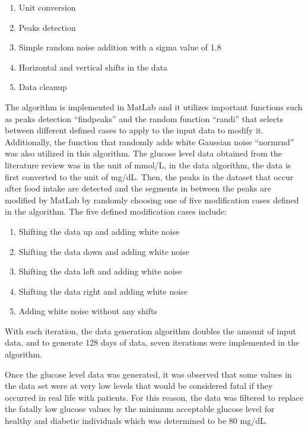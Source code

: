 \begin{enumerate}
    \item Unit conversion
    \item Peaks detection
    \item Simple random noise addition with a sigma value of 1.8
    \item Horizontal and vertical shifts in the data
    \item Data cleanup 
\end{enumerate}


The algorithm is implemented in MatLab and it utilizes important functions such as peaks detection “findpeaks” and the random function “randi” that selects between different defined cases to apply to the input data to modify it. Additionally, the function that randomly adds white Gaussian noise “normrnd” was also utilized in this algorithm.  
The glucose level data obtained from the literature review was in the unit of mmol/L, in the data algorithm, the data is first converted to the unit of mg/dL.
Then, the peaks in the dataset that occur after food intake are detected and the segments in between the peaks are modified by MatLab by randomly choosing one of five modification cases defined in the algorithm. 
The five defined modification cases include: 

\begin{enumerate}
    \item Shifting the data up and adding white noise 
    \item Shifting the data down and adding white noise 
    \item Shifting the data left and adding white noise
    \item Shifting the data right and adding white noise
    \item Adding white noise without any shifts
\end{enumerate}

With each iteration, the data generation algorithm doubles the amount of input data, and to generate 128 days of data, seven iterations were implemented in the algorithm.

Once the glucose level data was generated, it was observed that some values in the data set were at very low levels that would be considered fatal if they occurred in real life with patients. For this reason, the data was filtered to replace the fatally low glucose values by the minimum acceptable glucose level for healthy and diabetic individuals which was determined to be 80 mg/dL.


